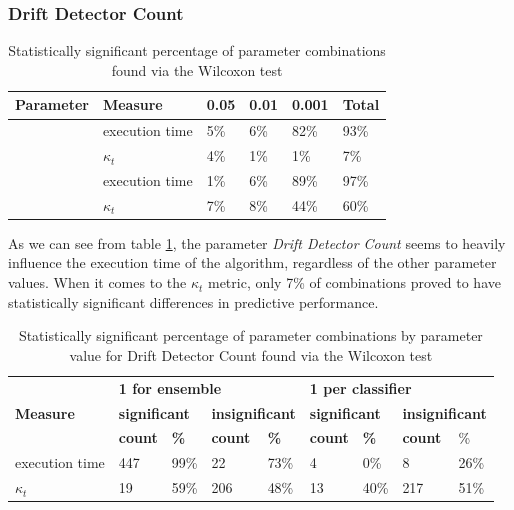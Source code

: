 \subsubsection{Drift Detector Count}

\begin{table}[]
\centering
\caption{\label{table:wilcoxon_significant}Statistically significant percentage of parameter combinations found via the Wilcoxon test}
\begin{tabular}{|l|l|l|l|l|l|}
\hline
\textbf{Parameter} & \textbf{Measure} & \textbf{0.05} & \textbf{0.01} & \textbf{0.001} & \textbf{Total} \\ \hline \hhline{======}
\multirow{2}{*}{Drift detector count} & execution time & 5\% & 6\% & 82\% & 93\% \\ \cline{2-6} 
 & $\kappa_t$ & 4\% & 1\% & 1\% & 7\% \\ \hline\hhline{======}
\multirow{2}{*}{Window type} & execution time & 1\% & 6\% & 89\% & 97\% \\ \cline{2-6} 
 & $\kappa_t$ & 7\% & 8\% & 44\% & 60\% \\ \hline
\end{tabular}
\end{table}

As we can see from table \ref{table:wilcoxon_significant}, the parameter \textit{Drift Detector Count} seems to heavily influence the execution time of the algorithm, regardless of the other parameter values. When it comes to the $\kappa_t$ metric, only 7\% of combinations proved to have statistically significant differences in predictive performance. 

\begin{table}[]
\centering
\caption{\label{table:wilcoxon_drift_detector_count}Statistically significant percentage of parameter combinations by parameter value for Drift Detector Count found via the Wilcoxon test}
\begin{tabular}{|l|l|l|l|l|l|l|l|l|}
\hline
\multirow{3}{*}{\textbf{Measure}} & \multicolumn{4}{l|}{\textbf{1 for ensemble}} & \multicolumn{4}{l|}{\textbf{1 per classifier}} \\ \cline{2-9} 
 & \multicolumn{2}{l|}{\textbf{significant}} & \multicolumn{2}{l|}{\textbf{insignificant}} & \multicolumn{2}{l|}{\textbf{significant}} & \multicolumn{2}{l|}{\textbf{insignificant}} \\ \cline{2-9} 
 & \textbf{count} & \textbf{\%} & \textbf{count} & \textbf{\%} & \textbf{count} & \textbf{\%} & \textbf{count} & \% \\ \hline \hhline{=========}
execution time & 447 & 99\% & 22 & 73\% & 4 & 0\% & 8 & 26\% \\ \hline
$\kappa_t$ & 19 & 59\% & 206 & 48\% & 13 & 40\% & 217 & 51\% \\ \hline
\end{tabular}
\end{table}



